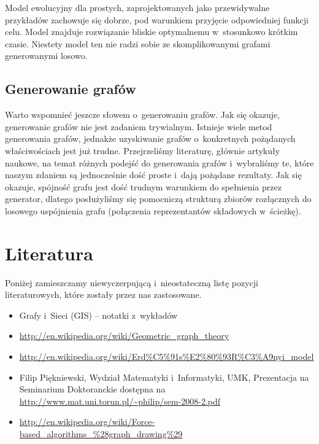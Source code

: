\documentclass[a4paper,onecolumn,oneside,12pt]{mwart}
\begin{document}
Model ewolucyjny dla prostych, zaprojektowanych jako przewidywalne
przykładów zachowuje się dobrze, pod warunkiem przyjęcie odpowiedniej
funkcji celu. Model znajduje rozwiązanie bliskie optymalnemu w~stosunkowo
krótkim czasie. Niestety model ten nie radzi sobie ze skomplikowanymi
grafami generowanymi losowo.

\subsection{Generowanie grafów}

Warto wspomnieć jeszcze słowem o~generowaniu grafów. Jak się okazuje,
generowanie grafów nie jest zadaniem trywialnym. Istnieje wiele metod
generowania grafów, jednakże uzyskiwanie grafów o~konkretnych pożądanych
właściwościach jest już trudne. Przejrzeliśmy literaturę, głównie artykuły
naukowe, na temat różnych podejść do generowania grafów i~wybraliśmy te,
które naszym zdaniem są jednocześnie dość proste i~dają pożądane rezultaty.
Jak się okazuje, spójność grafu jest dość trudnym warunkiem do spełnienia
przez generator, dlatego posłużyliśmy się pomocniczą strukturą zbiorów
rozłącznych do losowego uspójnienia grafu (połączenia reprezentantów
składowych w~ścieżkę).

\section{Literatura}

Poniżej zamieszczamy niewyczerpującą i~nieostateczną listę pozycji
literaturowych, które zostały przez nas zastosowane.

\begin{itemize}
	\item Grafy i~Sieci (GIS) -- notatki z~wykładów
	\item \url{http://en.wikipedia.org/wiki/Geometric\_graph\_theory}
	\item \url{http://en.wikipedia.org/wiki/Erd\%C5\%91s\%E2\%80\%93R\%C3\%A9nyi\_model}
	\item Filip Piękniewski, Wydział Matematyki i~Informatyki, UMK,
		Prezentacja na Seminarium Doktoranckie dostępna na
		\url{http://www.mat.uni.torun.pl/~philip/sem-2008-2.pdf}
	\item
		\url{http://en.wikipedia.org/wiki/Force-based\_algorithms\_\%28graph\_drawing\%29}

\end{itemize}
\end{document}
